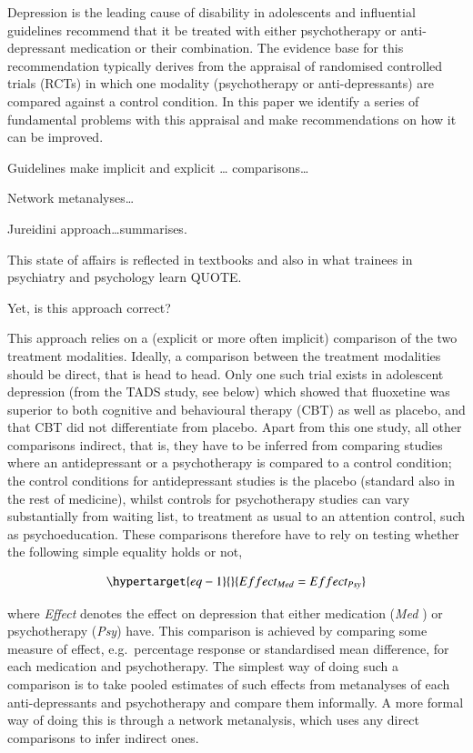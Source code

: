\documentclass[
  super,
  preprint,
  3p]{elsarticle}
\begin{document}
Depression is the leading cause of disability in adolescents and
influential guidelines recommend that it be treated with either
psychotherapy or anti-depressant medication or their combination. The
evidence base for this recommendation typically derives from the
appraisal of randomised controlled trials (RCTs) in which one modality
(psychotherapy or anti-depressants) are compared against a control
condition. In this paper we identify a series of fundamental problems
with this appraisal and make recommendations on how it can be improved.

Guidelines make implicit and explicit \ldots{} comparisons\ldots{}

Network metanalyses\ldots{}

Jureidini approach\ldots summarises.

This state of affairs is reflected in textbooks and also in what
trainees in psychiatry and psychology learn QUOTE.

Yet, is this approach correct?

This approach relies on a (explicit or more often implicit) comparison
of the two treatment modalities. Ideally, a comparison between the
treatment modalities should be direct, that is head to head. Only one
such trial exists in adolescent depression (from the TADS study, see
below) which showed that fluoxetine was superior to both cognitive and
behavioural therapy (CBT) as well as placebo, and that CBT did not
differentiate from placebo. Apart from this one study, all other
comparisons indirect, that is, they have to be inferred from comparing
studies where an antidepressant or a psychotherapy is compared to a
control condition; the control conditions for antidepressant studies is
the placebo (standard also in the rest of medicine), whilst controls for
psychotherapy studies can vary substantially from waiting list, to
treatment as usual to an attention control, such as psychoeducation.
These comparisons therefore have to rely on testing whether the
following simple equality holds or not,

\begin{equation}\protect\hypertarget{eq-1}{}{Effect_{Med} = Effect_{Psy}}\label{eq-1}\end{equation}

where \emph{Effect} denotes the effect on depression that either
medication (\emph{Med} ) or psychotherapy (\emph{Psy}) have. This
comparison is achieved by comparing some measure of effect,
e.g.~percentage response or standardised mean difference, for each
medication and psychotherapy. The simplest way of doing such a
comparison is to take pooled estimates of such effects from metanalyses
of each anti-depressants and psychotherapy and compare them informally.
A more formal way of doing this is through a network metanalysis, which
uses any direct comparisons to infer indirect ones.
\end{document}

